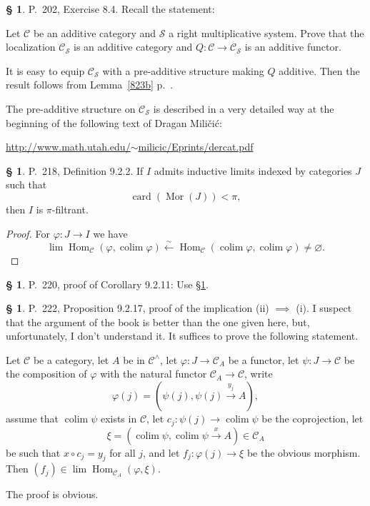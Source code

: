 \documentclass[12pt]{article}
\theoremstyle{remark}
\theoremstyle{definition}
\newtheorem{s}[thm]{\S}
\newcommand{\cc}{\mathcal}
\newcommand{\C}{\mathcal C}
\newcommand{\xr}{\xrightarrow}
\DeclareMathOperator*{\co}{colim}
\DeclareMathOperator{\Hom}{Hom}%
\DeclareMathOperator{\Mor}{Mor}
\begin{document}
%
%
\begin{s} 
P.~202, Exercise 8.4. Recall the statement: 

Let $\C$ be an additive category and $\cc S$ a right multiplicative system. Prove that the localization $\C_{\cc S}$ is an additive category and $Q:\C\to\C_{\cc S}$ is an additive functor. 

It is easy to equip $\C_{\cc S}$ with a pre-additive structure making $Q$ additive. Then the result follows from Lemma~\ref{823b} p.~\pageref{823b}. 

The pre-additive structure on $\C_{\cc S}$ is described in a very detailed way at the beginning of the following text of Dragan Mili\v{c}i\'c:%
%
\begin{center}\href{http://www.math.utah.edu/~milicic/Eprints/dercat.pdf}{http://www.math.utah.edu/$\sim$milicic/Eprints/dercat.pdf}
\end{center}
\end{s}
%
%
\begin{s}\label{922}
P.~218, Definition 9.2.2. If $I$ admits inductive limits indexed by categories $J$ such that 
$$
\operatorname{card}(\Mor(J))<\pi,
$$ 
then $I$ is $\pi$-filtrant.

\begin{proof}
For $\varphi:J\to I$ we have
$$
\lim\Hom_\C(\varphi,\co\varphi)\xleftarrow\sim\Hom_\C(\co\varphi,\co\varphi)\neq\varnothing.
$$
\end{proof}
\end{s}
%
%
\begin{s} 
P.~220, proof of Corollary 9.2.11: Use \S\ref{922}.
\end{s}
%
%
\begin{s} 
P.~222, Proposition 9.2.17, proof of the implication (ii) $\implies$ (i). I suspect that the argument of the book is better than the one given here, but, unfortunately, I don't understand it. It suffices to prove the following statement. 

Let $\C$ be a category, let $A$ be in $\C^\wedge$, let $\varphi:J\to\C_A$ be a functor, let $\psi:J\to\C$ be the composition of $\varphi$ with the natural functor $\C_A\to\C$, write 
$$
\varphi(j)=(\psi(j),\psi(j)\xr{y_j}A),
$$ 
assume that $\co\psi$ exists in $\C$, let $c_j:\psi(j)\to\co\psi$ be the coprojection, let 
$$
\xi=(\co\psi,\co\psi\xr x A)\in\C_A
$$ 
be such that $x\circ c_j=y_j$ for all $j$, and let $f_j:\varphi(j)\to\xi$ be the obvious morphism. Then $(f_j)\in\lim\Hom_{\C_A}(\varphi,\xi)$. 

The proof is obvious.
\end{s}
\end{document}
